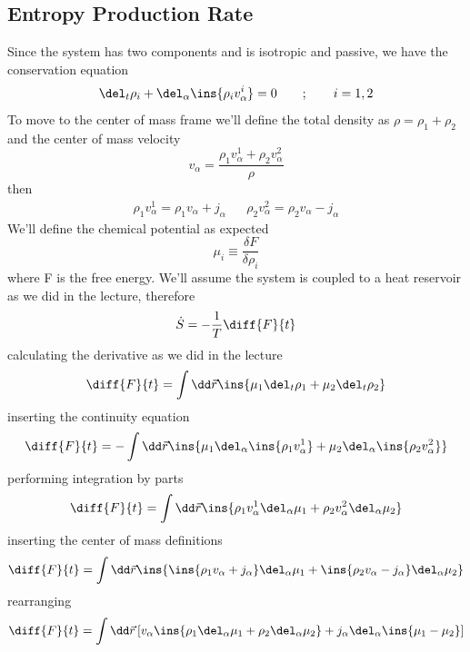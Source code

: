 \subsection{Entropy Production Rate}
Since the system has two components and is isotropic and passive, we have the conservation equation
\begin{equation}
	\del_t \rho_i + \del_\alpha\ins{\rho_i v_\alpha^i} = 0 \qquad ; \qquad i=1,2
\end{equation}
To move to the center of mass frame we'll define the total density as \(\rho = \rho_1 + \rho_2\) and the center of mass velocity 
\begin{equation}
	v_\alpha = \frac{\rho_1v_\alpha^1 + \rho_2 v_\alpha^2}{\rho}
\end{equation}
then
\begin{align}
	\rho_1 v_\alpha^1 = \rho_1 v_\alpha + j_\alpha && \rho_2 v_\alpha^2 = \rho_2 v_\alpha - j_\alpha
\end{align}
We'll define the chemical potential as expected
\begin{equation}
	\mu_i \equiv \frac{\delta F}{\delta \rho_i}
\end{equation}
where F is the free energy. We'll assume the system is coupled to a heat reservoir as we did in the lecture, therefore
\begin{equation}
	\dot{S} = -\frac{1}{T}\diff{F}{t}
\end{equation}
calculating the derivative as we did in the lecture
\begin{equation}
	\diff{F}{t} = \int \dd \vec{r} \ins{\mu_1\del_t\rho_1 + \mu_2\del_t\rho_2}
\end{equation}
inserting the continuity equation
\begin{equation}
	\diff{F}{t} = -\int \dd \vec{r} \ins{\mu_1\del_\alpha\ins{\rho_1 v_\alpha^1} + \mu_2\del_\alpha\ins{\rho_2 v_\alpha^2}}
\end{equation}
performing integration by parts
\begin{equation}
	\diff{F}{t} = \int \dd \vec{r}\ins{\rho_1 v_\alpha^1\del_\alpha\mu_1 + \rho_2 v_\alpha^2\del_\alpha\mu_2}
\end{equation}
inserting the center of mass definitions
\begin{equation}
	\diff{F}{t} = \int \dd \vec{r}\ins{\ins{\rho_1v_\alpha+j_\alpha}\del_\alpha\mu_1 + \ins{\rho_2v_\alpha-j_\alpha}\del_\alpha\mu_2}
\end{equation}
rearranging
\begin{equation}
	\diff{F}{t} = \int \dd\vec{r} \left[v_\alpha\ins{\rho_1\del_\alpha\mu_1+\rho_2\del_\alpha\mu_2} +j_\alpha\del_\alpha\ins{\mu_1-\mu_2}\right]
\end{equation}
